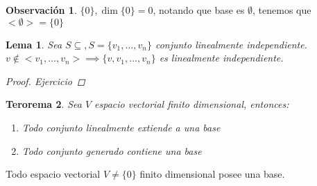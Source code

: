 \documentclass[11pt]{book}
\newtheorem{thm}{Terorema}[section]
\newtheorem{lem}[thm]{Lema}
\theoremstyle{definition}
\newtheorem{obs}{Observación}[section]
\begin{document}
\begin{obs}
$\{0\}, \dim\{0\}=0$, notando que base es $\emptyset$, tenemos que $<\emptyset>=\{0\}$
\end{obs}
\begin{lem}
Sea $S\subseteq , S=\{v_1,...,v_n\}$ conjunto linealmente independiente.\\
$v\notin<v_1,...,v_n>\implies\{v,v_1,...,v_n\}$ es linealmente independiente.
\begin{proof}
Ejercicio
\end{proof}
\end{lem}

\begin{thm}
Sea $V$ espacio vectorial finito dimensional, entonces:
\begin{enumerate}
	\item Todo conjunto linealmente extiende a una base
	
	\item Todo conjunto generado contiene una base
\end{enumerate}

\end{thm}
Todo espacio vectorial $V\neq\{0\}$ finito dimensional posee una base.
\end{document}
